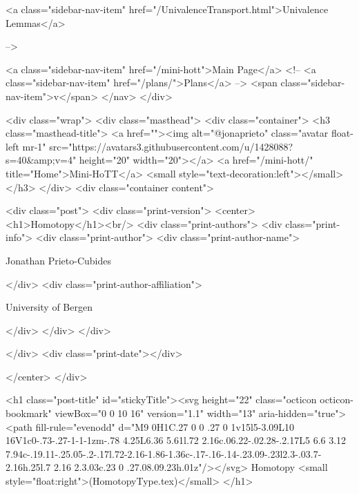      
    
      
        
          <a class="sidebar-nav-item" href="/UnivalenceTransport.html">Univalence Lemmas</a>
        
      
     -->

    <a class="sidebar-nav-item" href="/mini-hott">Main Page</a>
    <!-- <a class="sidebar-nav-item" href="/plans/">Plans</a> -->
    <span class="sidebar-nav-item">v</span>
  </nav>
</div>

    <div class="wrap">
      <div class="masthead">
        <div class="container">
          <h3 class="masthead-title">
            <a href=""><img alt="@jonaprieto" class="avatar float-left mr-1" src="https://avatars3.githubusercontent.com/u/1428088?s=40&amp;v=4" height="20" width="20"></a>
            <a href="/mini-hott/" title="Home">Mini-HoTT</a>
            <small style="text-decoration:left"></small>
          </h3>
        </div>
      <div class="container content">
        







<div class="post">
  <div class="print-version">
    <center>
      <h1>Homotopy</h1><br/>
        <div class="print-authors">
          <div class="print-info">
            <div class="print-author">
              <div class="print-author-name">
                
                  Jonathan Prieto-Cubides
                
              </div>
              <div class="print-author-affiliation">
                
                  University of Bergen
                
                </div>
            </div>
          </div>
          
          
        </div>
        <div class="print-date"></div>
        
        
    </center>
  </div>

  

  <h1 class="post-title" id="stickyTitle"><svg height="22" class="octicon octicon-bookmark" viewBox="0 0 10 16" version="1.1" width="13" aria-hidden="true"><path fill-rule="evenodd" d="M9 0H1C.27 0 0 .27 0 1v15l5-3.09L10 16V1c0-.73-.27-1-1-1zm-.78 4.25L6.36 5.61l.72 2.16c.06.22-.02.28-.2.17L5 6.6 3.12 7.94c-.19.11-.25.05-.2-.17l.72-2.16-1.86-1.36c-.17-.16-.14-.23.09-.23l2.3-.03.7-2.16h.25l.7 2.16 2.3.03c.23 0 .27.08.09.23h.01z"/></svg> Homotopy <small style="float:right">(HomotopyType.tex)</small>
  </h1>

